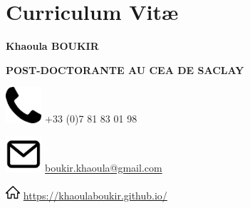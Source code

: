 

\let\cleardoublepage\clearpage
\chapter{Curriculum Vit\ae{}}

\begin{center}
{\huge  \textbf{\textcolor{myblue} {Khaoula} \textcolor{myblue}{BOUKIR}}}
\vspace{0.4cm}


\textcolor{2ndblue}{{\normalsize \textbf{{\Large P}\textcolor{2ndblue}{OST-DOCTORANTE AU }{\Large CEA }\textcolor{2ndblue}{ DE }{\Large S}\textcolor{2ndblue}{ACLAY}}}}


%

 
 \vspace{0.3cm}
 
 \begin{minipage}{0.3\textwidth}
 	\includegraphics[width=0.1\textwidth]{Figures/tel.png} +33 (0)7 81 83 01 98
 \end{minipage}
 \begin{minipage}{0.4\textwidth}
 	\includegraphics[width=0.1\textwidth]{Figures/mel.png} \url{boukir.khaoula@gmail.com}
 \end{minipage}


\vspace{0.3cm}


\includegraphics[width=0.04\textwidth]{Figures/web.png} \hspace{0.1cm} \url{https://khaoulaboukir.github.io/}

\end{center}


